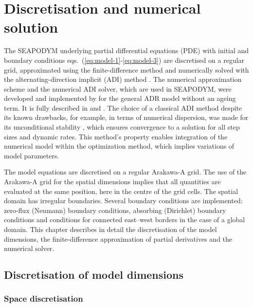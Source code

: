 \chapter{Discretisation and numerical solution}\label{ch:numerics}

The SEAPODYM underlying partial differential equations (PDE) with initial and boundary conditions eqs.~(\ref{eq:model-1}-\ref{eq:model-3}) are discretised on a regular grid, approximated using the finite-difference method and numerically solved with the alternating-direction implicit (ADI) method \citep{Press}. The numerical approximation scheme and the numerical ADI solver, which are used in SEAPODYM, were developed and implemented by \citet{Sibert-Fournier}  for the general ADR model without an ageing term. It is fully described in \citet{Sibert-Fournier} and \citet{Sibert}. The choice of a classical ADI method despite its known drawbacks, for example, in terms of numerical dispersion, was made for its unconditional stability \citep{Press}, which ensures convergence to a solution for all step sizes and dynamic rates. This method's property enables integration of the numerical model within the optimization method, which implies variations of model parameters. 

The model equations are discretised on a regular Arakawa-A grid. The use of the Arakawa-A grid for the spatial dimensions implies that all quantities are evaluated at the same position, here in the centre of the grid cells. The spatial domain has irregular boundaries. Several boundary conditions are implemented: zero-flux (Neumann) boundary conditions, absorbing (Dirichlet) boundary conditions and conditions for connected east--west borders in the case of a global domain. This chapter describes in detail the discretisation of the model dimensions, the finite-difference approximation of partial derivatives and the numerical solver. 

\section{Discretisation of model dimensions}
\label{sec:discretization}


\subsection{Space discretisation}
\label{sec:d-space}

